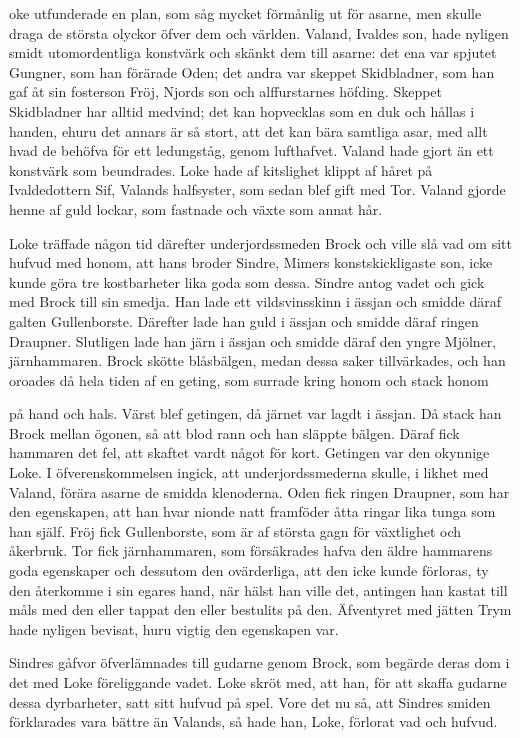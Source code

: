 \dropcapL oke utfunderade en plan, som såg mycket förmånlig ut för asarne, men
skulle draga de största olyckor öfver dem och världen. Valand, Ivaldes
son, hade nyligen smidt utomordentliga konstvärk och skänkt dem till
asarne: det ena var spjutet Gungner, som han förärade Oden; det andra
var skeppet Skidbladner, som han gaf åt sin fosterson Fröj, Njords son
och alffurstarnes höfding. Skeppet Skidbladner har alltid medvind; det
kan hopvecklas som en duk och hållas i handen, ehuru det annars är så
stort, att det kan bära samtliga asar, med allt hvad de behöfva för ett
ledungståg, genom lufthafvet. Valand hade gjort än ett konstvärk som
beundrades. Loke hade af kitslighet klippt af håret på Ivaldedottern
Sif, Valands halfsyster, som sedan blef gift med Tor. Valand gjorde
henne af guld lockar, som fastnade och växte som annat hår.

Loke träffade någon tid därefter underjordssmeden Brock och ville slå
vad om sitt hufvud med honom, att hans broder Sindre, Mimers
konstskickligaste son, icke kunde göra tre kostbarheter lika goda som
dessa. Sindre antog vadet och gick med Brock till sin smedja. Han lade
ett vildsvinsskinn i ässjan och smidde däraf galten Gullenborste.
Därefter lade han guld i ässjan och smidde däraf ringen Draupner.
Slutligen lade han järn i ässjan och smidde däraf den yngre Mjölner,
järnhammaren. Brock skötte blåsbälgen, medan dessa saker tillvärkades,
och han oroades då hela tiden af en geting, som surrade kring honom och
stack honom

på hand och hals. Värst blef getingen, då järnet var lagdt i ässjan. Då
stack han Brock mellan ögonen, så att blod rann och han släppte bälgen.
Däraf fick hammaren det fel, att skaftet vardt något för kort. Getingen
var den okynnige Loke. I öfverenskommelsen ingick, att
underjordssmederna skulle, i likhet med Valand, förära asarne de smidda
klenoderna. Oden fick ringen Draupner, som har den egenskapen, att han
hvar nionde natt framföder åtta ringar lika tunga som han själf. Fröj
fick Gullenborste, som är af största gagn för växtlighet och åkerbruk.
Tor fick järnhammaren, som försäkrades hafva den äldre hammarens goda
egenskaper och dessutom den ovärderliga, att den icke kunde förloras, ty
den återkomme i sin egares hand, när hälst han ville det, antingen han
kastat till måls med den eller tappat den eller bestulits på den.
Äfventyret med jätten Trym hade nyligen bevisat, huru vigtig den
egenskapen var.

Sindres gåfvor öfverlämnades till gudarne genom Brock, som begärde deras
dom i det med Loke föreliggande vadet. Loke skröt med, att han, för att
skaffa gudarne dessa dyrbarheter, satt sitt hufvud på spel. Vore det nu
så, att Sindres smiden förklarades vara bättre än Valands, så hade han,
Loke, förlorat vad och hufvud.

